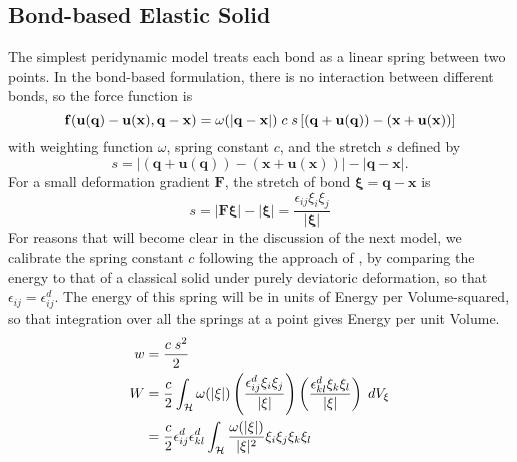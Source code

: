 \subsection{Bond-based Elastic Solid}
The simplest peridynamic model treats each bond as a linear spring between two points.
In the bond-based formulation, there is no interaction between different bonds, so the force function is
\begin{equation}
\mathit{\mathbf{f}}(\mathbf{u}(\mathbf{q})-\mathbf{u}(\mathbf{x}),\mathbf{q}-\mathbf{x}) = \omega(|\mathbf{q}-\mathbf{x}|)\;c\;s \left[(\mathbf{q}+\mathbf{u}(\mathbf{q}))-(\mathbf{x}+\mathbf{u}(\mathbf{x}))\right]
\end{equation}
with weighting function $\omega$, spring constant $c$, and the stretch $s$ defined by
\begin{equation}
\label{eq:stretch}
s = |(\mathbf{q}+\mathbf{u}(\mathbf{q}))-(\mathbf{x}+\mathbf{u}(\mathbf{x}))| - |\mathbf{q}-\mathbf{x}|.
\end{equation}For a small deformation gradient $\mathbf{F}$, the stretch of bond $\boldsymbol{\xi}=\mathbf{q}-\mathbf{x}$ is
\begin{equation*}
s = |\mathbf{F}\boldsymbol{\xi}|-|\boldsymbol{\xi}| = \frac{\epsilon_{ij}\xi_i\xi_j}{|\boldsymbol{\xi}|}
\end{equation*}
For reasons that will become clear in the discussion of the next model, we calibrate the spring constant $c$ following the approach of \cite{silling2007peridynamic}, by comparing the energy to that of a classical solid under purely deviatoric deformation, so that $\epsilon_{ij} = \epsilon_{ij}^d$.
The energy of this spring will be in units of Energy per Volume-squared, so that integration over all the springs at a point gives Energy per unit Volume.
\begin{align}
w &= \frac{c\;s^2}{2}\notag \\
W &= \frac{c}{2}\int_\mathcal{H} \omega(|\xi|)\left( \frac{\epsilon_{ij}^d\xi_i\xi_j}{|\xi|} \right)\left( \frac{\epsilon_{kl}^d\xi_k\xi_l}{|\xi|} \right)\;dV_\xi\notag\\
&= \frac{c}{2}\epsilon_{ij}^d \epsilon_{kl}^d \int_\mathcal{H} \frac{\omega(|\xi|)}{|\xi|^2}\xi_i\xi_j\xi_k\xi_l \notag
\end{align}
